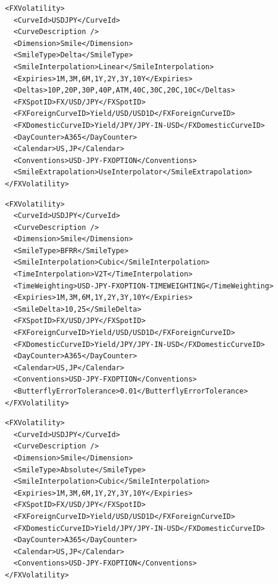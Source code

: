 \begin{longlisting}
\begin{verbatim}
  <FXVolatility>
    <CurveId>USDJPY</CurveId>
    <CurveDescription />
    <Dimension>Smile</Dimension>
    <SmileType>Delta</SmileType>
    <SmileInterpolation>Linear</SmileInterpolation>
    <Expiries>1M,3M,6M,1Y,2Y,3Y,10Y</Expiries>
    <Deltas>10P,20P,30P,40P,ATM,40C,30C,20C,10C</Deltas>
    <FXSpotID>FX/USD/JPY</FXSpotID>
    <FXForeignCurveID>Yield/USD/USD1D</FXForeignCurveID>
    <FXDomesticCurveID>Yield/JPY/JPY-IN-USD</FXDomesticCurveID>
    <DayCounter>A365</DayCounter>
    <Calendar>US,JP</Calendar>
    <Conventions>USD-JPY-FXOPTION</Conventions>
    <SmileExtrapolation>UseInterpolator</SmileExtrapolation>
  </FXVolatility>
\end{verbatim}
\caption{FX option volatility configuration Smile / Delta}
\label{lst:fxoptionvol_configuration_smile_delta}
\end{longlisting}

\begin{longlisting}
\begin{verbatim}
  <FXVolatility>
    <CurveId>USDJPY</CurveId>
    <CurveDescription />
    <Dimension>Smile</Dimension>
    <SmileType>BFRR</SmileType>
    <SmileInterpolation>Cubic</SmileInterpolation>
    <TimeInterpolation>V2T</TimeInterpolation>
    <TimeWeighting>USD-JPY-FXOPTION-TIMEWEIGHTING</TimeWeighting>
    <Expiries>1M,3M,6M,1Y,2Y,3Y,10Y</Expiries>
    <SmileDelta>10,25</SmileDelta>
    <FXSpotID>FX/USD/JPY</FXSpotID>
    <FXForeignCurveID>Yield/USD/USD1D</FXForeignCurveID>
    <FXDomesticCurveID>Yield/JPY/JPY-IN-USD</FXDomesticCurveID>
    <DayCounter>A365</DayCounter>
    <Calendar>US,JP</Calendar>
    <Conventions>USD-JPY-FXOPTION</Conventions>
    <ButterflyErrorTolerance>0.01</ButterflyErrorTolerance>
  </FXVolatility>
\end{verbatim}
\caption{FX option volatility configuration Smile / BFRR with 10 and 25 BF and RR}
\label{lst:fxoptionvol_configuration_smile_bfrr}
\end{longlisting}

\begin{longlisting}
\begin{verbatim}
  <FXVolatility>
    <CurveId>USDJPY</CurveId>
    <CurveDescription />
    <Dimension>Smile</Dimension>
    <SmileType>Absolute</SmileType>
    <SmileInterpolation>Cubic</SmileInterpolation>
    <Expiries>1M,3M,6M,1Y,2Y,3Y,10Y</Expiries>
    <FXSpotID>FX/USD/JPY</FXSpotID>
    <FXForeignCurveID>Yield/USD/USD1D</FXForeignCurveID>
    <FXDomesticCurveID>Yield/JPY/JPY-IN-USD</FXDomesticCurveID>
    <DayCounter>A365</DayCounter>
    <Calendar>US,JP</Calendar>
    <Conventions>USD-JPY-FXOPTION</Conventions>
  </FXVolatility>
\end{verbatim}
\caption{FX option volatility configuration Smile / Absolute vols}
\label{lst:fxoptionvol_configuration_smile_absolute}
\end{longlisting}

